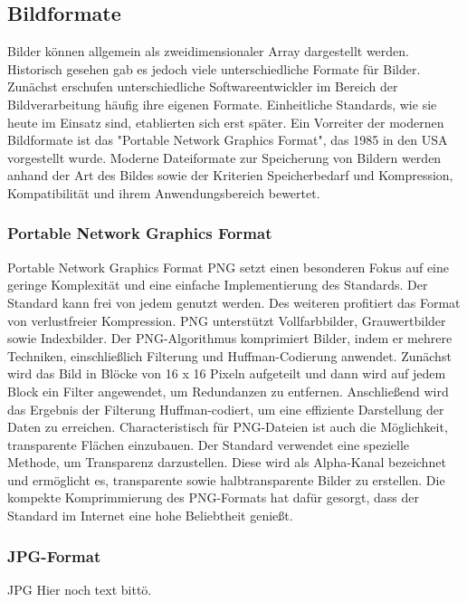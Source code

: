 \subsection{Bildformate}
    Bilder können allgemein als zweidimensionaler Array dargestellt werden.
    Historisch gesehen gab es jedoch viele unterschiedliche Formate für Bilder. 
    Zunächst erschufen unterschiedliche Softwareentwickler im Bereich der Bildverarbeitung häufig ihre eigenen Formate.
    Einheitliche Standards, wie sie heute im Einsatz sind, etablierten sich erst später.
    Ein Vorreiter der modernen Bildformate ist das "Portable Network Graphics Format", das 1985 in den USA vorgestellt wurde. 
    Moderne Dateiformate zur Speicherung von Bildern werden anhand der Art des Bildes sowie der Kriterien Speicherbedarf und Kompression, Kompatibilität und ihrem Anwendungsbereich bewertet. 
    
    \subsubsection{Portable Network Graphics Format}
        Portable Network Graphics Format \ac{PNG} setzt einen besonderen Fokus auf eine geringe Komplexität und eine einfache Implementierung des Standards. 
        Der Standard kann frei von jedem genutzt werden.
        Des weiteren profitiert das Format von verlustfreier Kompression. 
        PNG unterstützt Vollfarbbilder, Grauwertbilder sowie Indexbilder. 
        Der PNG-Algorithmus komprimiert Bilder, indem er mehrere Techniken, einschließlich Filterung und Huffman-Codierung anwendet. 
        Zunächst wird das Bild in Blöcke von 16 x 16 Pixeln aufgeteilt und dann wird auf jedem Block ein Filter angewendet, um Redundanzen zu entfernen. 
        Anschließend wird das Ergebnis der Filterung Huffman-codiert, um eine effiziente Darstellung der Daten zu erreichen.
        Characteristisch für PNG-Dateien ist auch die Möglichkeit, transparente Flächen einzubauen. 
        Der Standard verwendet eine spezielle Methode, um Transparenz darzustellen. 
        Diese wird als Alpha-Kanal bezeichnet und ermöglicht es, transparente sowie halbtransparente Bilder zu erstellen.
        Die kompekte Komprimmierung des PNG-Formats hat dafür gesorgt, dass der Standard im Internet eine hohe Beliebtheit genießt. 
    
    \subsubsection{JPG-Format}
        \ac{JPG}
        Hier noch text bittö.
        
